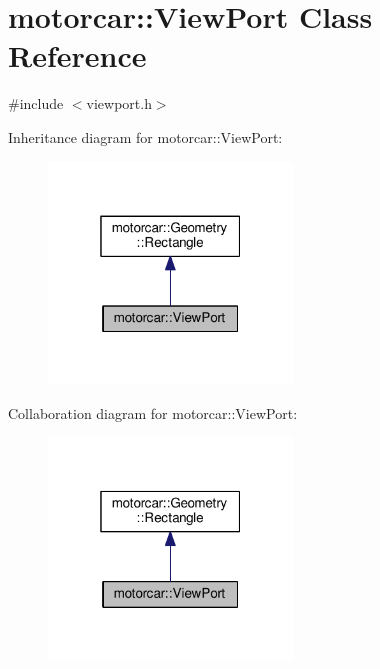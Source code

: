 \hypertarget{classmotorcar_1_1ViewPort}{\section{motorcar\-:\-:View\-Port Class Reference}
\label{classmotorcar_1_1ViewPort}
}


{\ttfamily \#include $<$viewport.\-h$>$}



Inheritance diagram for motorcar\-:\-:View\-Port\-:
\nopagebreak
\begin{figure}[H]
\begin{center}
\leavevmode
\includegraphics[width=184pt]{classmotorcar_1_1ViewPort__inherit__graph}
\end{center}
\end{figure}


Collaboration diagram for motorcar\-:\-:View\-Port\-:
\nopagebreak
\begin{figure}[H]
\begin{center}
\leavevmode
\includegraphics[width=184pt]{classmotorcar_1_1ViewPort__coll__graph}
\end{center}
\end{figure}

